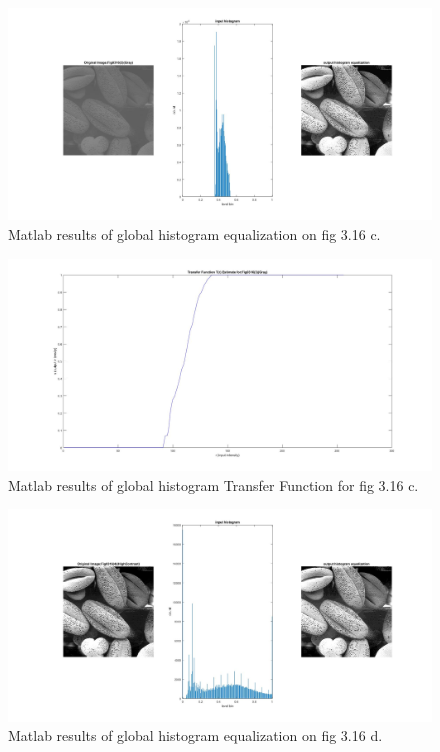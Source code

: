 \documentclass[./rarnold_report2.tex]{subfiles}
\begin{document}
\begin{enumerate}[a.]
	\begin{figure}[!htbp]
	\centering
	\includegraphics[scale=0.25]{"histo3"}
	\caption{Matlab results of global histogram equalization on fig 3.16 c.} 
	\label{histo3}
	\end{figure}
	
	\begin{figure}[!htbp]
	\centering
	\includegraphics[scale=0.25]{"transfer3"}
	\caption{Matlab results of global histogram Transfer Function for fig 3.16 c.} 
	\label{Tr3}
	\end{figure}
	
	\begin{figure}[!htbp]
	\centering
	\includegraphics[scale=0.25]{"histo4"}
	\caption{Matlab results of global histogram equalization on fig 3.16 d.} 
	\label{histo4}
	\end{figure}
	

\end{enumerate}
\end{document}
